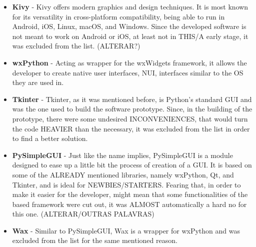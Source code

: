 \begin{itemize}
  \item \textbf{Kivy} - Kivy offers modern graphics and design techniques. It is most known for its versatility in cross-platform compatibility, being able to run in Android, iOS, Linux, macOS, and Windows. Since the developed software is not meant to work on Android or iOS, at least not in THIS/A early stage, it was excluded from the list. (ALTERAR?)\\
  
  \item \textbf{wxPython} - Acting as wrapper for the wxWidgets framework, it allows the developer to create native user interfaces, NUI, interfaces similar to the OS they are used in. \\ %
  
    \item \textbf{Tkinter} - Tkinter, as it was mentioned before, is Python's standard GUI and was the one used to build the software prototype. Since, in the building of the prototype, there were some undesired INCONVENIENCES, that would turn the code HEAVIER than the necessary, it was excluded from the list in order to find a better solution. \\
  
  \item \textbf{PySimpleGUI} - Just like the name implies, PySimpleGUI is a module designed to ease up a little bit the process of creation of a GUI. It is based on some of the ALREADY mentioned libraries, namely wxPython, Qt, and Tkinter, and is ideal for NEWBIES/STARTERS. Fearing that, in order to make it easier for the developer, might mean that some functionalities of the based framework were cut out, it was ALMOST automatically a hard no for this one. (ALTERAR/OUTRAS PALAVRAS)\\
  
  \item \textbf{Wax} - Similar to PySimpleGUI, Wax is a wrapper for wxPython and was excluded from the list for the same mentioned reason.\\  
  
\end{itemize}


